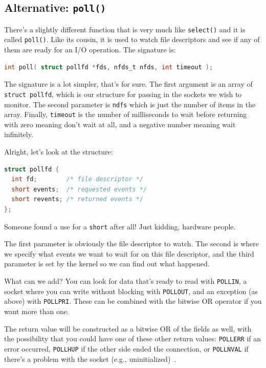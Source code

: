 \documentclass[a4paper]{report}
\begin{document}
\subsection*{Alternative: \texttt{poll()}}
There's a slightly different function that is very much like \texttt{select()} and it is called \texttt{poll()}. Like its cousin, it is used to watch file descriptors and see if any of them are ready for an I/O operation. The signature is:

\begin{lstlisting}[language=C]
int poll( struct pollfd *fds, nfds_t nfds, int timeout );
\end{lstlisting}

The signature is a lot simpler, that's for sure. The first argument is an array of \texttt{struct pollfd}, which is our structure for passing in the sockets we wish to monitor. The second parameter is \texttt{ndfs} which is just the number of items in the array. Finally, \texttt{timeout} is the number of milliseconds to wait before returning with zero meaning don't wait at all, and a negative number meaning wait infinitely.

Alright, let's look at the structure:

\begin{lstlisting}[language=C]
struct pollfd {
  int fd;        /* file descriptor */
  short events;  /* requested events */
  short revents; /* returned events */
};
\end{lstlisting}

Someone found a use for a \texttt{short} after all! Just kidding, hardware people.

The first parameter is obviously the file descriptor to watch. The second is where we specify what events we want to wait for on this file descriptor, and the third parameter is set by the kernel so we can find out what happened.

What can we add? You can look for data that's ready to read with \texttt{POLLIN}, a socket where you can write without blocking with \texttt{POLLOUT}, and an exception (as above) with \texttt{POLLPRI}. These can be combined with the bitwise OR operator if you want more than one.

The return value will be constructed as a bitwise OR of the fields as well, with the possibility that you could have one of these other return values: \texttt{POLLERR} if an error occurred, \texttt{POLLHUP} if the other side ended the connection, or \texttt{POLLNVAL} if there's a problem with the socket (e.g., uninitialized)~\cite{getaddrinfo}.
\end{document}

